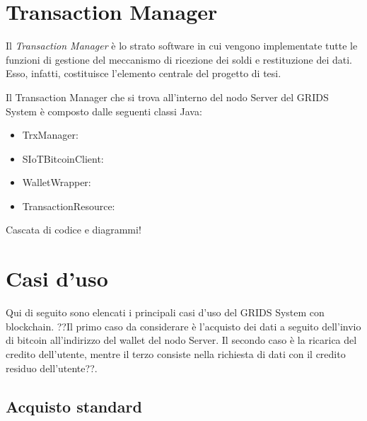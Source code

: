 \section{Transaction Manager}
\label{c:integr:trxmanager}

Il \textit{Transaction Manager} è lo strato software in cui vengono implementate tutte le funzioni di gestione del meccanismo di ricezione dei soldi e restituzione dei dati. Esso, infatti, costituisce l'elemento centrale del progetto di tesi.

Il Transaction Manager che si trova all'interno del nodo Server del GRIDS System è composto dalle seguenti classi Java:

\begin{itemize}
    \item TrxManager:
    \item SIoTBitcoinClient:
    \item WalletWrapper:
    \item TransactionResource:
\end{itemize}

Cascata di codice e diagrammi!

\section{Casi d'uso}
\label{c:integr:useCase}

Qui di seguito sono elencati i principali casi d'uso del GRIDS System con blockchain. ??Il primo caso da considerare è l'acquisto dei dati a seguito dell'invio di bitcoin all'indirizzo del wallet del nodo Server. Il secondo caso è la ricarica del credito dell'utente, mentre il terzo consiste nella richiesta di dati con il credito residuo dell'utente??.

\subsection{Acquisto standard}


